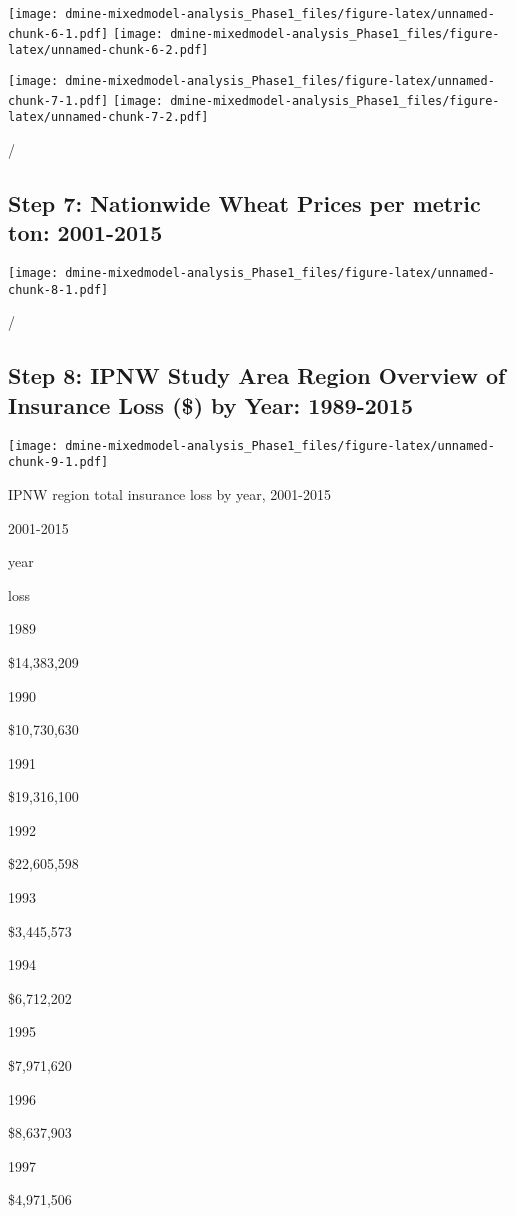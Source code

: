 \documentclass[]{article}
\begin{document}
\texttt{[image: dmine-mixedmodel-analysis\_Phase1\_files/figure-latex/unnamed-chunk-6-1.pdf]}
\texttt{[image: dmine-mixedmodel-analysis\_Phase1\_files/figure-latex/unnamed-chunk-6-2.pdf]}

\texttt{[image: dmine-mixedmodel-analysis\_Phase1\_files/figure-latex/unnamed-chunk-7-1.pdf]}
\texttt{[image: dmine-mixedmodel-analysis\_Phase1\_files/figure-latex/unnamed-chunk-7-2.pdf]}

/

\subsection{Step 7: Nationwide Wheat Prices per metric ton:
2001-2015}\label{step-7-nationwide-wheat-prices-per-metric-ton-2001-2015}

\texttt{[image: dmine-mixedmodel-analysis\_Phase1\_files/figure-latex/unnamed-chunk-8-1.pdf]}

/

\subsection{Step 8: IPNW Study Area Region Overview of Insurance Loss
(\$) by Year:
1989-2015}\label{step-8-ipnw-study-area-region-overview-of-insurance-loss-by-year-1989-2015}

\texttt{[image: dmine-mixedmodel-analysis\_Phase1\_files/figure-latex/unnamed-chunk-9-1.pdf]}

IPNW region total insurance loss by year, 2001-2015

2001-2015

year

loss

1989

\$14,383,209

1990

\$10,730,630

1991

\$19,316,100

1992

\$22,605,598

1993

\$3,445,573

1994

\$6,712,202

1995

\$7,971,620

1996

\$8,637,903

1997

\$4,971,506
\end{document}
